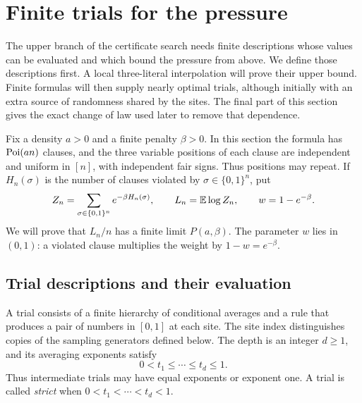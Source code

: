 \section{Finite trials for the pressure}
\label{ctr:section}

The upper branch of the certificate search needs finite descriptions whose
values can be evaluated and which bound the pressure from above.  We define
those descriptions first.  A local three-literal interpolation will prove
their upper bound.  Finite formulas will then supply nearly optimal trials,
although initially with an extra source of randomness shared by the sites.
The final part of this section gives the exact change of law used later to
remove that dependence.

Fix a density $a>0$ and a finite penalty $\beta>0$.  In this section the
formula has $\operatorname{Poi}(an)$ clauses, and the three variable positions of each
clause are independent and uniform in $[n]$, with independent fair signs.
Thus positions may repeat.  If $H_n(\sigma)$ is the number of clauses
violated by $\sigma\in\{0,1\}^n$, put
\begin{equation}
 Z_n=\sum_{\sigma\in\{0,1\}^n}e^{-\beta H_n(\sigma)},
 \qquad L_n=\mathbb E\log Z_n,\qquad w=1-e^{-\beta}.
 \label{ctr:pressure-data}
\end{equation}
We will prove that $L_n/n$ has a finite limit $P(a,\beta)$.  The parameter
$w$ lies in $(0,1)$: a violated clause multiplies the weight by
$1-w=e^{-\beta}$.

\subsection{Trial descriptions and their evaluation}

A trial consists of a finite hierarchy of conditional averages and a rule
that produces a pair of numbers in $[0,1]$ at each site.  The site index
distinguishes copies of the sampling generators defined below.  The depth is
an integer $d\ge1$, and its averaging exponents satisfy
\begin{equation}
 0<t_1\le\cdots\le t_d\le1.
 \label{ctr:exponents}
\end{equation}
Thus intermediate trials may have equal exponents or exponent one.  A trial
is called \emph{strict} when $0<t_1<\cdots<t_d<1$.

